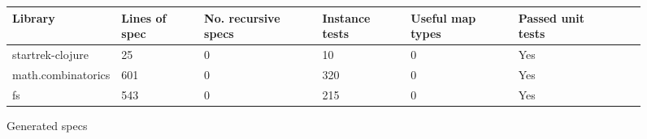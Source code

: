 \begin{figure*}
\begin{tabular}{| l | l | l | l | l | l | l | l |}
  Library            & Lines of spec & No. recursive specs & Instance tests & Useful map types & Passed unit tests \\
  \hline
  startrek-clojure   & 25            & 0                   & 10             & 0                & Yes\\
  math.combinatorics & 601           & 0                   & 320            & 0                & Yes\\
  fs                 & 543           & 0                   & 215            & 0                & Yes \\
\end{tabular}
\caption{Generated specs}
  \label{infer:fig:genspec}
\end{figure*}




% 
% 
%
% 
